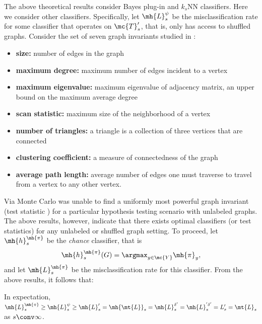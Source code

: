 \documentclass[10pt,journal,cspaper,compsoc]{IEEEtran}
\begin{document}
The above theoretical results consider Bayes plug-in and $k_s$NN classifiers. Here we consider other classifiers.  Specifically,  let $\mh{L}^{\psi}_s$ be the misclassification rate for some classifier that operates on $\mc{T}_s'$, that is, only has access to shuffled graphs.  Consider the set of seven graph invariants studied in \cite{PCP10}:
\begin{itemize}
	\item \textbf{size:} number of edges in the graph
	\item \textbf{maximum degree:} maximum number of edges incident to a vertex
	\item \textbf{maximum eigenvalue:} maximum eigenvalue of adjacency matrix, an upper bound on the maximum average degree
	\item \textbf{scan statistic:} maximum size of the neighborhood of a vertex
	\item \textbf{number of triangles:} a triangle is a collection of three vertices that are connected
	\item \textbf{clustering coefficient:} a measure of connectedness of the graph
	\item \textbf{average path length:} average number of edges one must traverse to travel from a vertex to any other vertex.
\end{itemize}
Via Monte Carlo \cite{PCP10} was unable to find a uniformly most powerful graph invariant (test statistic \cite{PCR10}) for a particular hypothesis testing scenario with unlabeled graphs.  The above results, however, indicate that there exists optimal classifiers (or test statistics) for any unlabeled or shuffled graph setting.  %
To proceed, let $\mh{h}^{\mh{\pi}}_s$ be the \emph{chance} classifier, that is
\begin{align}
	\mh{h}_s^{\mh{\pi}}(G)=\argmax_{y\in\mc{Y}} \mh{\pi}_y,
\end{align}
and let $\mh{L}^{\mh{\pi}}_s$ be the misclassification rate for this classifier.  From the above results, it follows that:
\begin{thm} \label{thm:order}
	In expectation, \\ $\mh{L}^{\mh{\pi}}_s \geq \mh{L}^{\psi}_s \geq \mh{L}_s'=\mh{\mt{L}}_s = \mh{L}^{\delta'}_s=\mh{L}^{'\delta'}_s=L_s'=\mt{L}_s$ as $s \conv \infty$. 
\end{thm}
\end{document}
